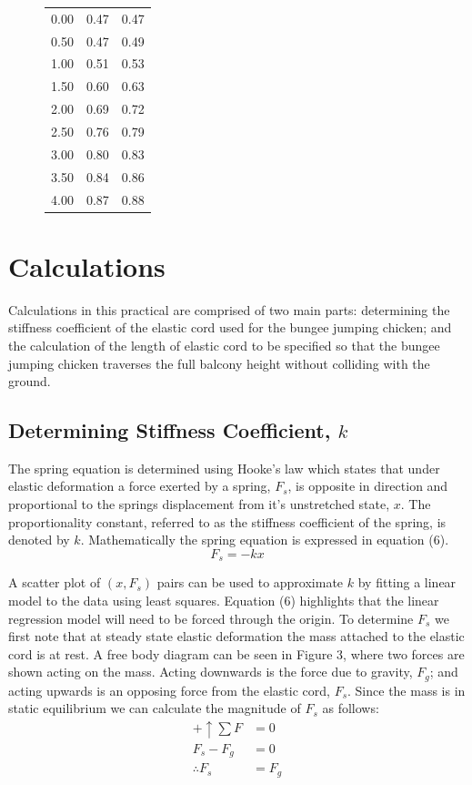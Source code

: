 \documentclass[a4paper]{article}
\newlength{\arrow}
\begin{document}
\begin{figure}[h]
\begin{minipage}{0.45\textwidth}
\begin{tabular}{rrr}
				\midrule
				0.00 & 0.47 & 0.47\\
				0.50 & 0.47 & 0.49\\
				1.00 & 0.51 & 0.53\\
				1.50 & 0.60 & 0.63\\
				2.00 & 0.69 & 0.72\\
				2.50 & 0.76 & 0.79\\
				3.00 & 0.80 & 0.83\\
				3.50 & 0.84 & 0.86\\
				4.00 & 0.87 & 0.88\\
				\bottomrule
			\end{tabular}
	\end{minipage}
\end{figure}


\section{Calculations}
Calculations in this practical are comprised of two main parts: determining the stiffness coefficient of the elastic cord used for the bungee jumping chicken; and the calculation of the length of elastic cord to be specified so that the bungee jumping chicken traverses the full balcony height without colliding with the ground.

\subsection{Determining Stiffness Coefficient, $k$}
The spring equation is determined using Hooke's law which states that under elastic deformation a force exerted by a spring, $F_s$, is opposite in direction and proportional to the springs displacement from it's unstretched state, $x$. The proportionality constant, referred to as the stiffness coefficient of the spring, is denoted by $k$. Mathematically the spring equation is expressed in equation (6).
\begin{equation}
F_s = -kx
\end{equation} 

A scatter plot of $(x, F_s)$ pairs can be used to approximate $k$ by fitting a linear model to the data using least squares. Equation (6) highlights that the linear regression model will need to be forced through the origin. To determine $F_s$ we first note that at steady state elastic deformation the mass attached to the elastic cord is at rest. A free body diagram can be seen in Figure 3, where two forces are shown acting on the mass. Acting downwards is the force due to gravity, $F_g$; and acting upwards is an opposing force from the elastic cord, $F_s$. Since the mass is in static equilibrium we can calculate the magnitude of $F_s$ as follows:
\begin{align}
+ \uparrow \sum F &= 0 \nonumber \\
F_s - F_g &= 0 \nonumber \\
\therefore F_s &= F_g
\end{align} 
\end{document}
